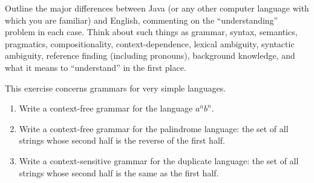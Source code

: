 \begin{exercise}
Outline the major differences between Java (or any other computer
language with which you are familiar) and English, commenting on the
``understanding'' problem in each case.  Think about such things as
grammar, syntax, semantics, pragmatics, compositionality,
context-dependence, lexical ambiguity, syntactic ambiguity,
reference finding (including pronouns), background knowledge, and what
it means to ``understand'' in the first place.
\end{exercise} 

\begin{exercise}
This exercise concerns grammars for very simple languages.
\begin{enumerate}
\item Write a context-free grammar for the language \(a^n b^n\).
\item Write a context-free grammar for the palindrome language: the set of all
strings whose second half is the reverse of the first half.
\item Write a context-sensitive grammar for the duplicate language: the set of
all strings whose second half is the same as the first half.
\end{enumerate}
\end{exercise} 

